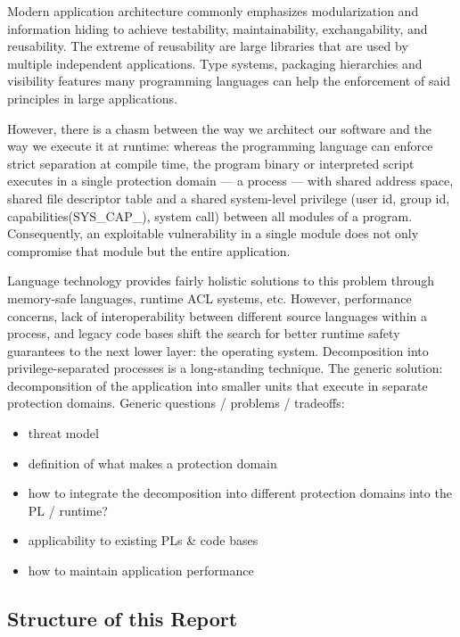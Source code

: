 \documentclass[10pt,twocolumn,letter]{article}
\begin{document}
Modern application architecture commonly emphasizes modularization and information hiding to achieve testability, maintainability, exchangability, and reusability.
The extreme of reusability are large libraries that are used by multiple independent applications.
Type systems, packaging hierarchies and visibility features many programming languages can help the enforcement of said principles in large applications.

However, there is a chasm between the way we architect our software and the way we execute it at runtime:
whereas the programming language can enforce strict separation at compile time,
the program binary or interpreted script executes in a single protection domain --- a process ---
with shared address space, shared file descriptor table and a shared system-level privilege (user id, group id, capabilities(SYS\_CAP\_), system call) between all modules of a program.
Consequently, an exploitable vulnerability in a single module does not only compromise that module but the entire application.

Language technology provides fairly holistic solutions to this problem through memory-safe languages, runtime ACL systems, etc.
However, performance concerns, lack of interoperability between different source languages within a process, and legacy code bases shift the search for better runtime safety guarantees to the next lower layer: the operating system.
Decomposition into privilege-separated processes is a long-standing technique.
The generic solution: decomponsition of the application into smaller units that execute in separate protection domains.
Generic questions / problems / tradeoffs:
\begin{itemize}
  \item threat model
  \item definition of what makes a protection domain
  \item how to integrate the decomposition into different protection domains into the PL / runtime?
  \item applicability to existing PLs \& code bases
  \item how to maintain application performance
\end{itemize}

\subsection{Structure of this Report}
\blindtext{}
\end{document}
